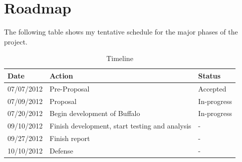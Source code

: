 \section{Roadmap}
The following table shows my tentative schedule for the major phases of the project.

\begin{table}[h]
\centering
\begin{tabular}{|l|l|l|}
\hline
Date & Action & Status\\
\hline
07/07/2012 & Pre-Proposal & Accepted\\
07/09/2012 & Proposal & In-progress\\
07/20/2012 & Begin development of Buffalo & In-progress\\
09/10/2012 & Finish development, start testing and analysis & - \\
09/27/2012 & Finish report & - \\
10/10/2012 & Defense & - \\
\hline
\end{tabular}
\caption{Timeline}
\label{tab:template}
\end{table}



\singlespacing




